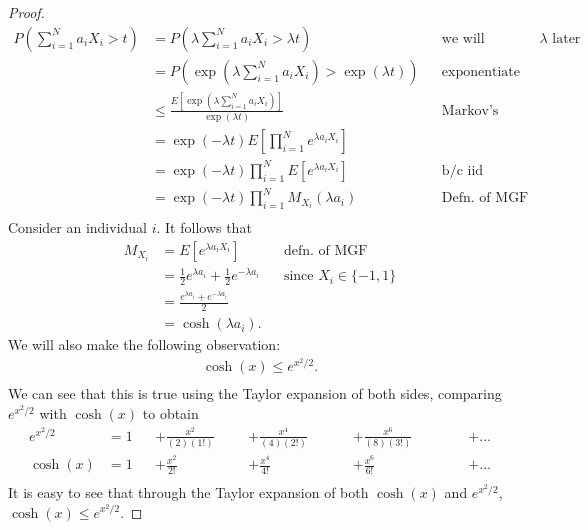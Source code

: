\begin{proof}
    \begin{align*}
        P\left( \sum_{i=1}^{N} a_i X_i > t \right) &= P\left( \lambda\sum_{i=1}^{N} a_i X_i > \lambda t \right) && \text{we will optimize for $\lambda$ later} \\
        &= P\left( \exp\left(\lambda\sum_{i=1}^{N} a_i X_i\right) > \exp\left(\lambda t\right) \right) && \text{exponentiate both sides} \\
        &\leq \frac{ E\left[ \exp\left(\lambda\sum_{i=1}^{N} a_i X_i\right) \right] }{\exp(\lambda t)} && \text{Markov's Inequality} \\ 
        &= \exp(-\lambda t) E\left[ \prod_{i=1}^{N}e^{\lambda a_i X_i} \right] \\ 
        &= \exp(-\lambda t) \prod_{i=1}^{N} E\left[ e^{\lambda a_i X_i} \right] && \text{b/c iid} \\ 
        &= \exp(-\lambda t) \prod_{i=1}^{N} M_{X_i}(\lambda a_i) && \text{Defn. of MGF} \\ 
    \end{align*}
    Consider an individual $i$. It follows that 
    \begin{align*}
        M_{X_i} &= E\left[ e^{\lambda a_i X_i} \right] && \text{defn. of MGF} \\ 
        &= \frac{1}{2} e^{\lambda a_i} + \frac{1}{2} e^{-\lambda a_i} && \text{since $X_i \in \{-1,1\}$} \\ 
        &= \frac{e^{\lambda a_i} + e^{-\lambda a_i}}{2} \\ 
        &= \cosh( \lambda a_i ). 
    \end{align*}
    We will also make the following observation:
    \begin{align*}
        \cosh(x) \leq e^{x^2/2}. \\ 
    \end{align*}
    We can see that this is true using the Taylor expansion of both sides, comparing $e^{x^2/2}$ with $\cosh(x)$ to obtain 
    \begin{align*}
        e^{x^2/2} &= 1 &&+ \frac{x^2}{(2)(1!)} &&&+ \frac{x^4}{(4)(2!)} &&&&+ \frac{x^6}{(8)(3!)} &&&&&+ ... \\ 
        \cosh(x) &= 1 &&+ \frac{x^2}{2!} &&&+ \frac{x^4}{4!} &&&&+ \frac{x^6}{6!} &&&&&+ ... \\ 
    \end{align*}
    It is easy to see that through the Taylor expansion of both $\cosh(x)$ and $e^{x^2/2}$, $\cosh(x) \leq e^{x^2/2}.$
    

\end{proof}
